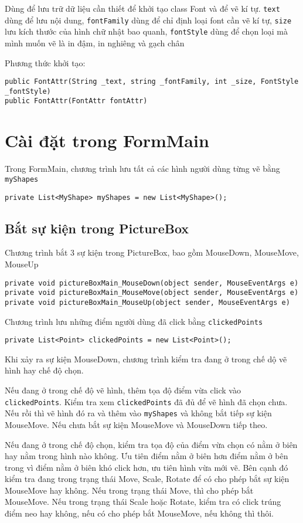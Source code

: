 \documentclass[12pt]{article}
\begin{document}
Dùng để lưu trữ dữ liệu cần thiết để khởi tạo class Font và để vẽ kí tự.
\texttt{text} dùng để lưu nội dung,
\texttt{fontFamily} dùng để chỉ định loại font cần vẽ kí tự,
\texttt{size} lưu kích thước của hình chữ nhật bao quanh,
\texttt{fontStyle} dùng để chọn loại mà mình muốn vẽ là in đậm, in nghiêng và gạch chân

Phương thức khởi tạo:
\begin{lstlisting}
public FontAttr(String _text, string _fontFamily, int _size, FontStyle _fontStyle)
public FontAttr(FontAttr fontAttr)
\end{lstlisting}

\section{Cài đặt trong FormMain}
Trong FormMain, chương trình lưu tất cả các hình người dùng từng vẽ bằng \texttt{myShapes}
\begin{lstlisting}
private List<MyShape> myShapes = new List<MyShape>();
\end{lstlisting}


\subsection{Bắt sự kiện trong PictureBox}
Chương trình bắt 3 sự kiện trong PictureBox,
bao gồm MouseDown, MouseMove, MouseUp
\begin{lstlisting}
private void pictureBoxMain_MouseDown(object sender, MouseEventArgs e)
private void pictureBoxMain_MouseMove(object sender, MouseEventArgs e)
private void pictureBoxMain_MouseUp(object sender, MouseEventArgs e)
\end{lstlisting}

Chương trình lưu những điểm người dùng đã click bằng \texttt{clickedPoints}
\begin{lstlisting}
private List<Point> clickedPoints = new List<Point>();
\end{lstlisting}

Khi xảy ra sự kiện MouseDown,
chương trình kiểm tra đang ở trong chế dộ vẽ hình hay chế độ chọn.

Nếu đang ở trong chế độ vẽ hình, thêm tọa độ điểm vừa click vào \texttt{clickedPoints}.
Kiểm tra xem \texttt{clickedPoints} đã đủ để vẽ hình đã chọn chưa.
Nếu rồi thì vẽ hình đó ra và thêm vào \texttt{myShapes} và không bắt tiếp sự kiện MouseMove.
Nếu chưa bắt sự kiện MouseMove và MouseDown tiếp theo.

Nếu đang ở trong chế độ chọn, kiểm tra tọa độ của điểm vừa chọn có nằm ở biên hay nằm trong hình nào không.
Ưu tiên điểm nằm ở biên hơn điểm nằm ở bên trong vì điểm nằm ở biên khó click hơn,
ưu tiên hình vừa mới vẽ. Bên cạnh đó kiểm tra đang trong trạng thái Move, Scale, Rotate để có cho phép
bắt sự kiện MouseMove hay không. Nếu trong trạng thái Move, thì cho phép bắt MouseMove.
Nếu trong trạng thái Scale hoặc Rotate, kiểm tra có click trúng điểm neo hay không,
nếu có cho phép bắt MouseMove, nếu không thì thôi.
\end{document}
